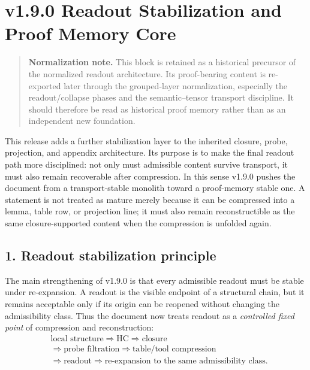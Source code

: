 \section*{v1.9.0 Readout Stabilization and Proof Memory Core}
\begin{quote}
\textbf{Normalization note.} This block is retained as a historical precursor of the normalized readout architecture. Its proof-bearing content is re-exported later through the grouped-layer normalization, especially the readout/collapse phases and the semantic--tensor transport discipline. It should therefore be read as historical proof memory rather than as an independent new foundation.
\end{quote}

This release adds a further stabilization layer to the inherited closure, probe,
projection, and appendix architecture. Its purpose is to make the final readout
path more disciplined: not only must admissible content survive transport, it
must also remain recoverable after compression. In this sense v1.9.0 pushes
the document from a transport-stable monolith toward a proof-memory stable one.
A statement is not treated as mature merely because it can be compressed into a
lemma, table row, or projection line; it must also remain reconstructible as the
same closure-supported content when the compression is unfolded again.

\subsection*{1. Readout stabilization principle}
The main strengthening of v1.9.0 is that every admissible readout must be
stable under re-expansion. A readout is the visible endpoint of a structural
chain, but it remains acceptable only if its origin can be reopened without
changing the admissibility class. Thus the document now treats readout as a
\emph{controlled fixed point} of compression and reconstruction:
\[
\begin{aligned}
&\text{local structure} \Longrightarrow \text{HC} \Longrightarrow \text{closure}\\
&\Longrightarrow \text{probe filtration} \Longrightarrow \text{table/tool compression}\\
&\Longrightarrow \text{readout} \Longrightarrow \text{re-expansion to the same admissibility class}.
\end{aligned}
\]

